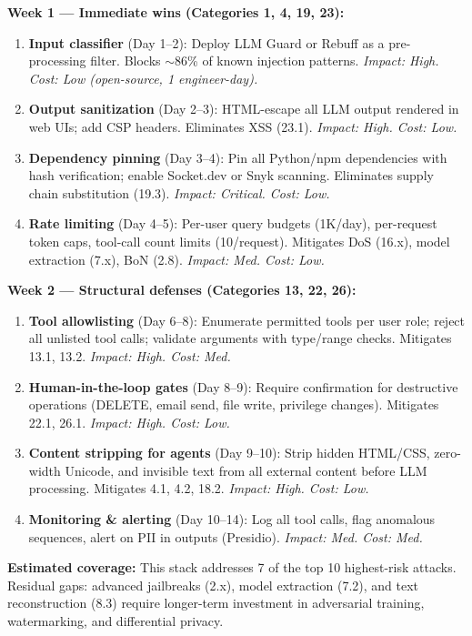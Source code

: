 \documentclass[conference]{IEEEtran}
\begin{document}
\begin{tcolorbox}[keyfinding, title={MVP Defense Stack: Week 1--2 Deployment Plan}]
\textbf{Week 1 --- Immediate wins (Categories 1, 4, 19, 23):}
\begin{enumerate}[leftmargin=*, nosep]
  \item \textbf{Input classifier} (Day 1--2): Deploy LLM Guard or Rebuff as a pre-processing filter. Blocks $\sim$86\% of known injection patterns. \textit{Impact: High. Cost: Low (open-source, 1 engineer-day).}
  \item \textbf{Output sanitization} (Day 2--3): HTML-escape all LLM output rendered in web UIs; add CSP headers. Eliminates XSS (23.1). \textit{Impact: High. Cost: Low.}
  \item \textbf{Dependency pinning} (Day 3--4): Pin all Python/npm dependencies with hash verification; enable Socket.dev or Snyk scanning. Eliminates supply chain substitution (19.3). \textit{Impact: Critical. Cost: Low.}
  \item \textbf{Rate limiting} (Day 4--5): Per-user query budgets (1K/day), per-request token caps, tool-call count limits (10/request). Mitigates DoS (16.x), model extraction (7.x), BoN (2.8). \textit{Impact: Med. Cost: Low.}
\end{enumerate}

\textbf{Week 2 --- Structural defenses (Categories 13, 22, 26):}
\begin{enumerate}[leftmargin=*, nosep, start=5]
  \item \textbf{Tool allowlisting} (Day 6--8): Enumerate permitted tools per user role; reject all unlisted tool calls; validate arguments with type/range checks. Mitigates 13.1, 13.2. \textit{Impact: High. Cost: Med.}
  \item \textbf{Human-in-the-loop gates} (Day 8--9): Require confirmation for destructive operations (DELETE, email send, file write, privilege changes). Mitigates 22.1, 26.1. \textit{Impact: High. Cost: Low.}
  \item \textbf{Content stripping for agents} (Day 9--10): Strip hidden HTML/CSS, zero-width Unicode, and invisible text from all external content before LLM processing. Mitigates 4.1, 4.2, 18.2. \textit{Impact: High. Cost: Low.}
  \item \textbf{Monitoring \& alerting} (Day 10--14): Log all tool calls, flag anomalous sequences, alert on PII in outputs (Presidio). \textit{Impact: Med. Cost: Med.}
\end{enumerate}

\textbf{Estimated coverage:} This stack addresses 7 of the top 10 highest-risk attacks. Residual gaps: advanced jailbreaks (2.x), model extraction (7.2), and text reconstruction (8.3) require longer-term investment in adversarial training, watermarking, and differential privacy.
\end{tcolorbox}
\end{document}
